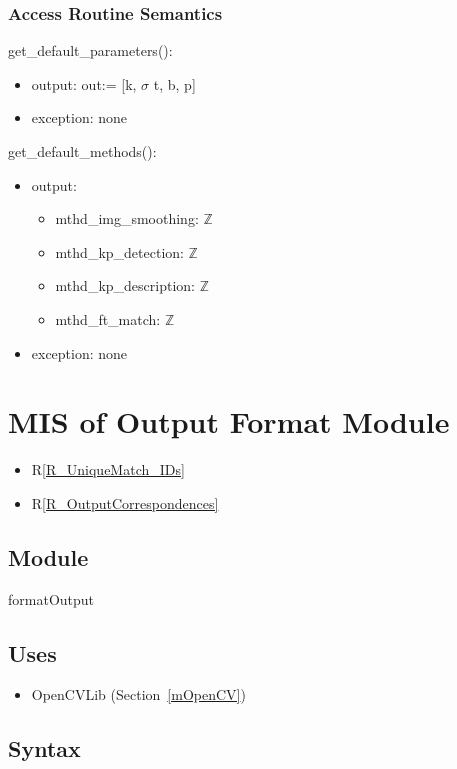 \documentclass[12pt, titlepage]{article}
\begin{document}
\subsubsection{Access Routine Semantics}
\noindent get\_default\_parameters():
\begin{itemize}
\item output: out:= [k, $\sigma$ t, b, p]
  \item exception: none  
\end{itemize}

\noindent get\_default\_methods():
\begin{itemize}
\item output:
  \begin{itemize}
    \item mthd\_img\_smoothing: $\mathbb{Z}$
    \item mthd\_kp\_detection: $\mathbb{Z}$ 
    \item mthd\_kp\_description: $\mathbb{Z}$
    \item mthd\_ft\_match: $\mathbb{Z}$
  \end{itemize}
  \item exception: none 
\end{itemize}



\section{MIS of Output Format Module} \label{mOF}
\begin{itemize}
  \item R\ref{R_UniqueMatch_IDs}
  \item R\ref{R_OutputCorrespondences}
\end{itemize}
\subsection{Module}

formatOutput

\subsection{Uses}
\begin{itemize}
  \item OpenCVLib (Section~\ref{mOpenCV})
\end{itemize}

\subsection{Syntax}
\end{document}
